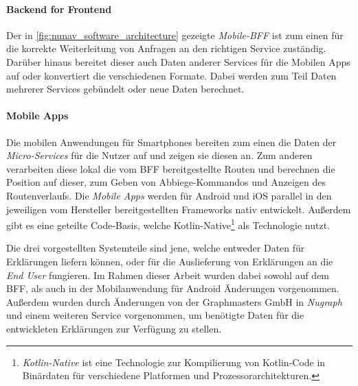 \paragraph{Backend for Frontend} Der in \autoref{fig:nunav_software_architecture} gezeigte \textit{Mobile-BFF} ist zum einen für die korrekte Weiterleitung von Anfragen an den richtigen Service zuständig. Darüber hinaus bereitet dieser auch Daten anderer Services für die Mobilen Apps auf oder konvertiert die verschiedenen Formate. Dabei werden zum Teil Daten mehrerer Services gebündelt oder neue Daten berechnet. 

\paragraph{Mobile Apps} Die mobilen Anwendungen für Smartphones bereiten zum einen die Daten der \textit{Micro-Services} für die Nutzer auf und zeigen sie diesen an. Zum anderen verarbeiten diese lokal die vom BFF bereitgestellte Routen und berechnen die Position auf dieser, zum Geben von Abbiege-Kommandos und Anzeigen des Routenverlaufs. Die \textit{Mobile Apps} werden für Android und iOS parallel in den jeweiligen vom Hersteller bereitgestellten Frameworks nativ entwickelt. Außerdem gibt es eine geteilte Code-Basis, welche Kotlin-Native\footnote{\textit{Kotlin-Native} ist eine Technologie zur Kompilierung von Kotlin-Code in Binärdaten für verschiedene Platformen und Prozessorarchitekturen.} als Technologie nutzt.

\bigskip

Die drei vorgestellten Systemteile sind jene, welche entweder Daten für Erklärungen liefern können, oder für die Auslieferung von Erklärungen an die \textit{End User} fungieren. Im Rahmen dieser Arbeit wurden dabei sowohl auf dem BFF, als auch in der Mobilanwendung für Android Änderungen vorgenommen. Außerdem wurden durch Änderungen von der Graphmasters GmbH in \textit{Nugraph} und einem weiteren Service vorgenommen, um benötigte Daten für die entwickleten Erklärungen zur Verfügung zu stellen.